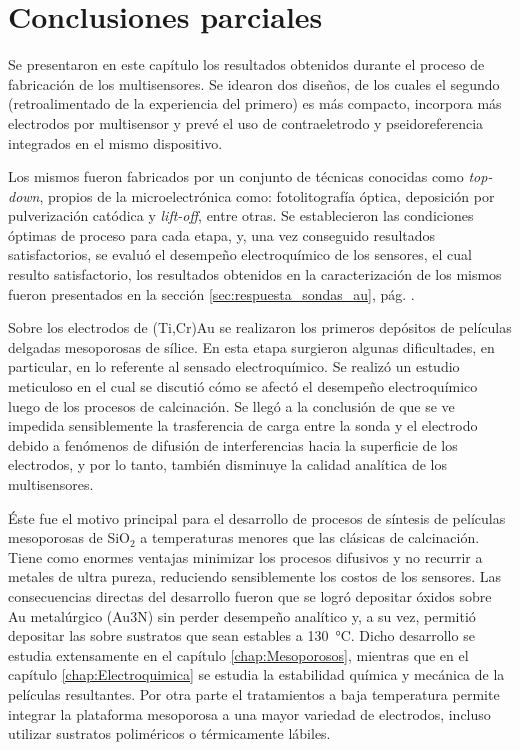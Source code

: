 \section{Conclusiones parciales}

	Se presentaron en este capítulo los resultados obtenidos durante el proceso de fabricación de los multisensores. Se idearon dos diseños, de los cuales el segundo (retroalimentado de la experiencia del primero) es más compacto, incorpora más electrodos por multisensor y prevé el uso de contraeletrodo y pseidoreferencia integrados en el mismo dispositivo.
	
	Los mismos fueron fabricados por un conjunto de técnicas conocidas como \textit{top-down}, propios de la microelectrónica como: fotolitografía óptica, deposición por pulverización catódica y \textit{lift-off}, entre otras. Se establecieron las condiciones óptimas de proceso para cada etapa, y, una vez conseguido resultados satisfactorios, se evaluó el desempeño electroquímico de los sensores, el cual resulto satisfactorio, los resultados obtenidos en la caracterización de los mismos fueron presentados en la sección \ref{sec:respuesta_sondas_au}, pág. \pageref{sec:respuesta_sondas_au}. 

	Sobre los electrodos de (Ti,Cr)\textbar Au se realizaron los primeros depósitos de películas delgadas mesoporosas de sílice. En esta etapa surgieron algunas dificultades, en particular, en lo referente al sensado electroquímico. Se realizó un estudio meticuloso en el cual se discutió cómo se afectó el desempeño electroquímico luego de los procesos de calcinación. Se llegó a la conclusión de que se ve impedida sensiblemente la trasferencia de carga entre la sonda y el electrodo debido a fenómenos de difusión de interferencias hacia la superficie de los electrodos, y por lo tanto, también disminuye la calidad analítica de los multisensores.

	Éste fue el motivo principal para el desarrollo de procesos de síntesis de películas mesoporosas de SiO$_2$ a temperaturas menores que las clásicas de calcinación. Tiene como enormes ventajas minimizar los procesos difusivos y no recurrir a metales de ultra pureza, reduciendo sensiblemente los costos de los sensores. Las consecuencias directas del desarrollo fueron que se logró depositar óxidos sobre Au metalúrgico (Au3N) sin perder desempeño analítico y, a su vez, permitió depositar las \pdm\space sobre sustratos que sean estables a \SI{130}{\celsius}. Dicho desarrollo se estudia extensamente en el capítulo \ref{chap:Mesoporosos}, mientras que en el capítulo \ref{chap:Electroquimica} se estudia la estabilidad química y mecánica de la películas resultantes. Por otra parte el tratamientos a baja temperatura permite integrar la plataforma mesoporosa a una mayor variedad de electrodos, incluso utilizar sustratos poliméricos o térmicamente lábiles.

